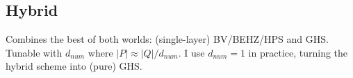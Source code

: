 
\subsection{Hybrid}
Combines the best of both worlds: (single-layer) BV/BEHZ/HPS and GHS. Tunable with $d_{num}$ where $|P| \approx |Q|/d_{num}$. I use $d_{num} = 1$ in practice, turning the hybrid scheme into (pure) GHS.